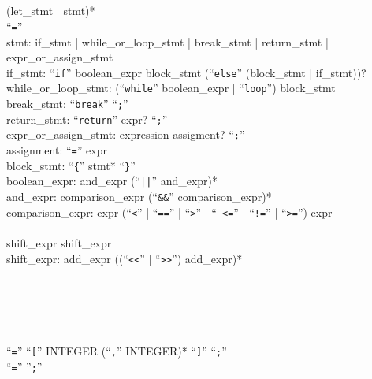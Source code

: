 \begin{Paragraph}
\\
\\
\\
\\
 (let\_stmt | stmt)* \\
 ``{\tt =}'' \\
stmt: if\_stmt | while\_or\_loop\_stmt | break\_stmt | return\_stmt |
expr\_or\_assign\_stmt\\
if\_stmt: ``{\tt if}'' boolean\_expr block\_stmt (``{\tt else}'' (block\_stmt |
if\_stmt))?\\
while\_or\_loop\_stmt: (``{\tt while}'' boolean\_expr | ``{\tt loop}'')
block\_stmt\\
break\_stmt: ``{\tt break}'' ``{\tt ;}''\\
return\_stmt: ``{\tt return}'' expr? ``{\tt ;}''\\
expr\_or\_assign\_stmt: expression assigment? ``{\tt ;}''\\
assignment: ``{\tt =}'' expr\\
block\_stmt: ``{\tt \{}'' stmt* ``{\tt \}}''\\
boolean\_expr: and\_expr (``{\tt ||}'' and\_expr)*\\
and\_expr: comparison\_expr (``{\tt \&\&}'' comparison\_expr)*\\
comparison\_expr: expr (``{\tt <}'' | ``{\tt ==}'' | ``{\tt >}'' | ``{\tt
<=}'' | ``{\tt !=}'' | ``{\tt >=}'') expr\\
\\
 shift\_expr 
shift\_expr\unchanged{)*}\\
shift\_expr: add\_expr ((``\verb!<<!'' | ``\verb!>>!'') add\_expr)*\\
\\
\\
\\
\\
\\
 ``{\tt =}'' ``{\tt [}''
INTEGER (``{\tt ,}'' INTEGER)* ``{\tt ]}'' ``{\tt ;}''\\
 ``{\tt =}'' 
''{\tt ;}''
\end{Paragraph}

